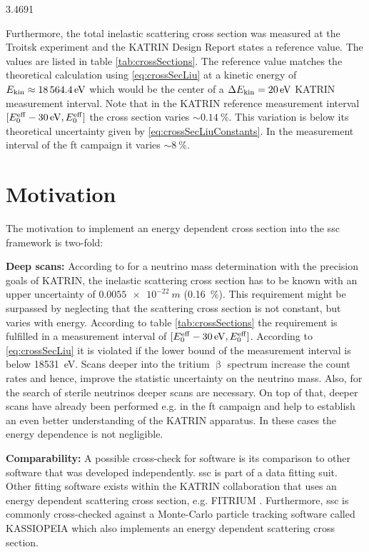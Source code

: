 3.4691

Furthermore, the total inelastic scattering cross section was measured at the Troitsk experiment and the KATRIN Design Report states a reference value. The values are listed in table \ref{tab:crossSections}. The reference value matches the theoretical calculation using \eqref{eq:crossSecLiu} at a kinetic energy of $E_\mathrm{kin}\approx\SI{18564.4}{eV}$ which would be the center of a $\Delta E_\mathrm{kin}=\SI{20}{eV}$ KATRIN measurement interval. Note that in the KATRIN reference measurement interval $[E_0^\mathrm{eff}-\SI{30}{eV}, E_0^\mathrm{eff}]$ the cross section varies  $\sim\SI{0.14}{\percent}$. This variation is below its theoretical uncertainty given by \eqref{eq:crossSecLiuConstants}. In the measurement interval of the \gls{ft} campaign it varies $\sim\SI{8}{\percent}$.
    
\section{Motivation}
The motivation to implement an energy dependent cross section into the \gls{ssc} framework is two-fold:
\par{\textbf{Deep scans:} According to \cite{Groh2015} for a neutrino mass determination with the precision goals of KATRIN, the inelastic scattering cross section has to be known with an upper uncertainty of $\SI{0.0055e-22}{m}$ (\SI{0.16}{\percent}). This requirement might be surpassed by neglecting that the scattering cross section is not constant, but varies with energy. According to table \ref{tab:crossSections} the requirement is fulfilled in a measurement interval of $[E_0^\mathrm{eff}-\SI{30}{eV}, E_0^\mathrm{eff}]$. According to \eqref{eq:crossSecLiu} it is violated if the lower bound of the measurement interval is below \SI{18531}{eV}. Scans deeper into the tritium $\upbeta$ spectrum increase the count rates and hence, improve the statistic uncertainty on the neutrino mass. Also, for the search of sterile neutrinos deeper scans are necessary. On top of that, deeper scans have already been performed e.g. in the \gls{ft} campaign and help to establish an even better understanding of the KATRIN apparatus. In these cases the energy dependence is not negligible.}
\par{\textbf{Comparability:} A possible cross-check for software is its comparison to other software that was developed independently. \gls{ssc} is part of a data fitting suit. Other fitting software exists within the KATRIN collaboration that uses an energy dependent scattering cross section, e.g. FITRIUM \cite{Fitrium}. Furthermore, \gls{ssc} is commonly cross-checked against a Monte-Carlo particle tracking software called KASSIOPEIA \cite{KATRINCOL2019} which also implements an energy dependent scattering cross section.}
    
